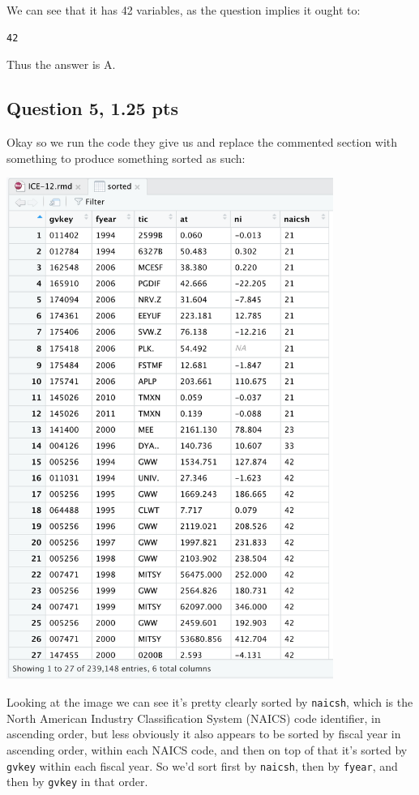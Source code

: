 \documentclass[11pt]{article}
\begin{document}
We can see that it has 42 variables, as the question implies it ought to:

\begin{verbatim}
42
\end{verbatim}


Thus the answer is A.

\subsection*{Question 5, 1.25 pts}
\label{sec:org16c9ec3}
Okay so we run the code they give us and replace the commented section with something to produce something sorted as such:

\begin{center}
\includegraphics[width=0.8\textwidth]{./q5.png}
\end{center}


Looking at the image we can see it's pretty clearly sorted by \texttt{naicsh}, which is the North American Industry Classification System (NAICS) code identifier, in ascending order, but less obviously it also appears to be sorted by fiscal year in ascending order, within each NAICS code, and then on top of that it's sorted by \texttt{gvkey} within each fiscal year.  So we'd sort first by \texttt{naicsh}, then by \texttt{fyear}, and then by \texttt{gvkey} in that order.
\end{document}
